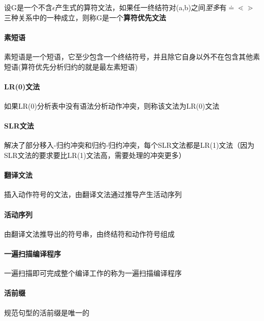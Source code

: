 \documentclass[UTF8]{ctexart} %
\begin{document}
设G是一个不含$\epsilon$产生式的算符文法，如果任一终结符对(a,b)之间\emph{至多}有$\doteq \lessdot \gtrdot $三种关系中的一种成立，则称G是一个\textbf{算符优先文法}

\paragraph{素短语} 素短语是一个短语，它至少包含一个终结符号，并且除它自身以外不在包含其他素短语(算符优先分析归约的就是最左素短语)

\paragraph{LR(0)文法} 如果LR(0)分析表中没有语法分析动作冲突，则称该文法为LR(0)文法

\paragraph{SLR文法} 解决了部分移入-归约冲突和归约-归约冲突，每个SLR文法都是LR(1)文法（因为SLR文法的要求要比LR(1)文法高，需要处理的冲突更多）

\paragraph{翻译文法} 插入动作符号的文法，由翻译文法通过推导产生活动序列

\paragraph{活动序列} 由翻译文法推导出的符号串，由终结符和动作符号组成

\paragraph{一遍扫描编译程序} 一遍扫描即可完成整个编译工作的称为一遍扫描编译程序

\paragraph{活前缀} 规范句型的活前缀是唯一的
\end{document}
